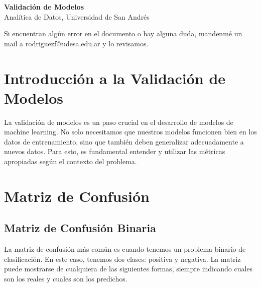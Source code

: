 \documentclass[12pt]{article}
\begin{document}
\begin{center}
  {\LARGE \textbf{Validación de Modelos}}\\[0.5em]
  {Analítica de Datos, Universidad de San Andrés}
\end{center}

Si encuentran algún error en el documento o hay alguna duda, mandenmé un mail a rodriguezf@udesa.edu.ar y lo revisamos.

\section{Introducción a la Validación de Modelos}
La validación de modelos es un paso crucial en el desarrollo de modelos de machine learning. No solo necesitamos que nuestros modelos funcionen bien en los datos de entrenamiento, sino que también deben generalizar adecuadamente a nuevos datos. Para esto, es fundamental entender y utilizar las métricas apropiadas según el contexto del problema.

\section{Matriz de Confusión}
\subsection{Matriz de Confusión Binaria}
La matriz de confusión más común es cuando tenemos un problema binario de clasificación. En este caso, tenemos dos clases: positiva y negativa. La matriz puede mostrarse de cualquiera de las siguientes formas, siempre indicando cuales son los reales y cuales son los predichos.

\begin{center}
\hspace{2cm}
\end{center}
\end{document}

